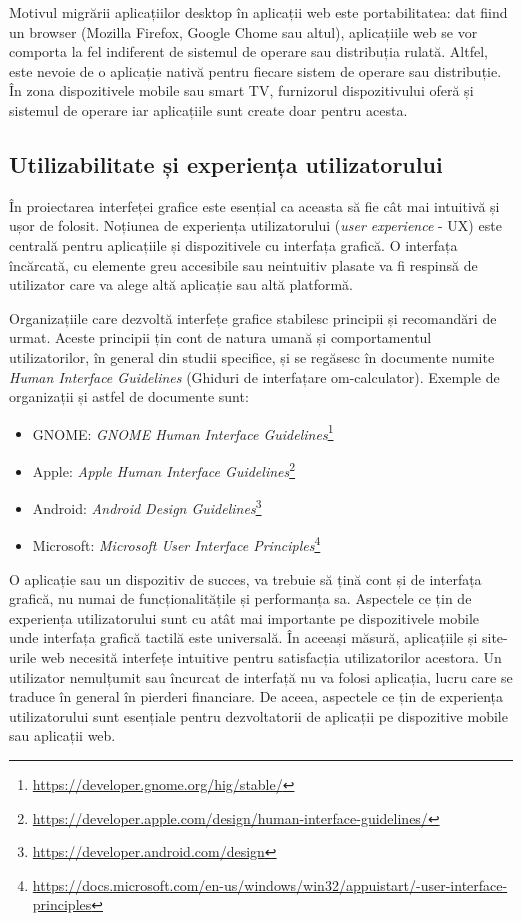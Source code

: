 Motivul migrării aplicațiilor desktop în aplicații web este portabilitatea: dat fiind un browser (Mozilla Firefox, Google Chome sau altul), aplicațiile web se vor comporta la fel indiferent de sistemul de operare sau distribuția rulată. Altfel, este nevoie de o aplicație nativă pentru fiecare sistem de operare sau distribuție. În zona dispozitivele mobile sau smart TV, furnizorul dispozitivului oferă și sistemul de operare iar aplicațiile sunt create doar pentru acesta.

\subsection{Utilizabilitate și experiența utilizatorului}
\label{sec:ui:ux}

În proiectarea interfeței grafice este esențial ca aceasta să fie cât mai intuitivă și ușor de folosit. Noțiunea de experiența utilizatorului (\textit{user experience} - UX) este centrală pentru aplicațiile și dispozitivele cu interfața grafică. O interfața încărcată, cu elemente greu accesibile sau neintuitiv plasate va fi respinsă de utilizator care va alege altă aplicație sau altă platformă.

Organizațiile care dezvoltă interfețe grafice stabilesc principii și recomandări de urmat. Aceste principii țin cont de natura umană și comportamentul utilizatorilor, în general din studii specifice, și se regăsesc în documente numite \textit{Human Interface Guidelines} (Ghiduri de interfațare om-calculator). Exemple de organizații și astfel de documente sunt:

\begin{itemize}
  \item GNOME: \textit{GNOME Human Interface Guidelines}\footnote{\url{https://developer.gnome.org/hig/stable/}}
  \item Apple: \textit{Apple Human Interface Guidelines}\footnote{\url{https://developer.apple.com/design/human-interface-guidelines/}}
  \item Android: \textit{Android Design Guidelines}\footnote{\url{https://developer.android.com/design}}
  \item Microsoft: \textit{Microsoft User Interface Principles}\footnote{\url{https://docs.microsoft.com/en-us/windows/win32/appuistart/-user-interface-principles}}
\end{itemize}

O aplicație sau un dispozitiv de succes, va trebuie să țină cont și de interfața grafică, nu numai de funcționalitățile și performanța sa. Aspectele ce țin de experiența utilizatorului sunt cu atât mai importante pe dispozitivele mobile unde interfața grafică tactilă este universală. În aceeași măsură, aplicațiile și site-urile web necesită interfețe intuitive pentru satisfacția utilizatorilor acestora. Un utilizator nemulțumit sau încurcat de interfață nu va folosi aplicația, lucru care se traduce în general în pierderi financiare. De aceea, aspectele ce țin de experiența utilizatorului sunt esențiale pentru dezvoltatorii de aplicații pe dispozitive mobile sau aplicații web.


